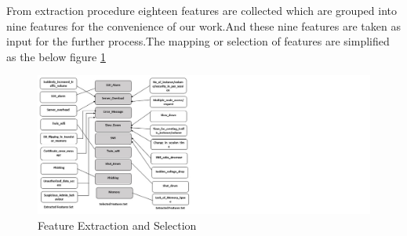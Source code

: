 From extraction procedure eighteen features are collected which are grouped into nine features for the convenience of our work.And these nine features are taken as input for the further process.The mapping or selection of features are simplified as the below figure \ref{fig:feature}
\begin{figure}[ht]
    \centering
    \includegraphics{Chap4/feature.jpg}
    \caption{Feature Extraction and Selection}
    \label{fig:feature}
\end{figure}

